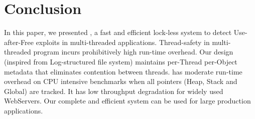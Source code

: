 \section{Conclusion} \label{conclusion}
In this paper, we presented \projectname{}, a fast and efficient lock-less system to detect Use-after-Free exploits in multi-threaded applications. Thread-safety in multi-threaded program incurs prohibitively high run-time overhead. Our design (inspired from Log-structured file system) maintains per-Thread per-Object metadata that eliminates contention between threads. \projectname{} has moderate run-time overhead on CPU intensive benchmarks when all pointers (Heap, Stack and Global) are tracked. It has low throughput degradation for widely used WebServers. Our complete and efficient \projectname{} system can be used for large production applications.

